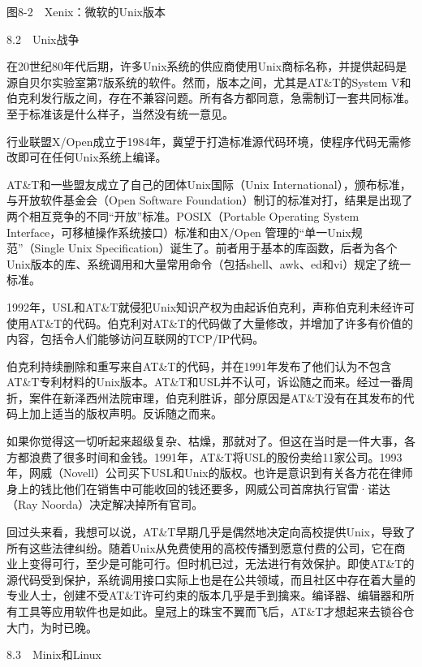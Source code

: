 \documentclass[a4paper,12pt,UTF8,twoside]{ctexbook}
\begin{document}
图8-2　Xenix：微软的Unix版本





8.2　Unix战争


在20世纪80年代后期，许多Unix系统的供应商使用Unix商标名称，并提供起码是源自贝尔实验室第7版系统的软件。然而，版本之间，尤其是AT\&T的System V和伯克利发行版之间，存在不兼容问题。所有各方都同意，急需制订一套共同标准。至于标准该是什么样子，当然没有统一意见。

行业联盟X/Open成立于1984年，冀望于打造标准源代码环境，使程序代码无需修改即可在任何Unix系统上编译。

AT\&T和一些盟友成立了自己的团体Unix国际（Unix International），颁布标准，与开放软件基金会（Open Software Foundation）制订的标准对打，结果是出现了两个相互竞争的不同“开放”标准。POSIX（Portable Operating System Interface，可移植操作系统接口）标准和由X/Open 管理的“单一Unix规范”（Single Unix Specification）诞生了。前者用于基本的库函数，后者为各个Unix版本的库、系统调用和大量常用命令（包括shell、awk、ed和vi）规定了统一标准。

1992年，USL和AT\&T就侵犯Unix知识产权为由起诉伯克利，声称伯克利未经许可使用AT\&T的代码。伯克利对AT\&T的代码做了大量修改，并增加了许多有价值的内容，包括令人们能够访问互联网的TCP/IP代码。

伯克利持续删除和重写来自AT\&T的代码，并在1991年发布了他们认为不包含AT\&T专利材料的Unix版本。AT\&T和USL并不认可，诉讼随之而来。经过一番周折，案件在新泽西州法院审理，伯克利胜诉，部分原因是AT\&T没有在其发布的代码上加上适当的版权声明。反诉随之而来。

如果你觉得这一切听起来超级复杂、枯燥，那就对了。但这在当时是一件大事，各方都浪费了很多时间和金钱。1991年，AT\&T将USL的股份卖给11家公司。1993年，网威（Novell）公司买下USL和Unix的版权。也许是意识到有关各方花在律师身上的钱比他们在销售中可能收回的钱还要多，网威公司首席执行官雷·诺达（Ray Noorda）决定解决掉所有官司。

回过头来看，我想可以说，AT\&T早期几乎是偶然地决定向高校提供Unix，导致了所有这些法律纠纷。随着Unix从免费使用的高校传播到愿意付费的公司，它在商业上变得可行，至少是可能可行。但时机已过，无法进行有效保护。即使AT\&T的源代码受到保护，系统调用接口实际上也是在公共领域，而且社区中存在着大量的专业人士，创建不受AT\&T许可约束的版本几乎是手到擒来。编译器、编辑器和所有工具等应用软件也是如此。皇冠上的珠宝不翼而飞后，AT\&T才想起来去锁谷仓大门，为时已晚。





8.3　Minix和Linux
\end{document}
